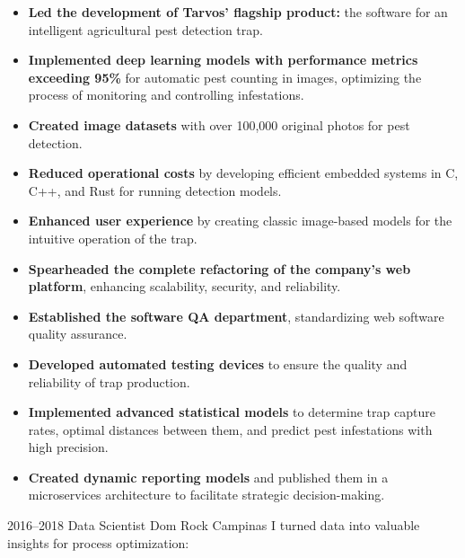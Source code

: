 \documentclass[11pt,a4paper,sans]{moderncv}        %
\begin{document}
\begin{itemize}%
  \item \textbf{Led the development of Tarvos' flagship product:} the software for an intelligent agricultural pest detection trap.
  \item \textbf{Implemented deep learning models with performance metrics exceeding 95\%} for automatic pest counting in images, optimizing the process of monitoring and controlling infestations.
  \item \textbf{Created image datasets} with over 100,000 original photos for pest detection.
  \item \textbf{Reduced operational costs} by developing efficient embedded systems in C, C++, and Rust for running detection models.
  \item \textbf{Enhanced user experience} by creating classic image-based models for the intuitive operation of the trap.
  \item \textbf{Spearheaded the complete refactoring of the company's web platform}, enhancing scalability, security, and reliability.
  \item \textbf{Established the software QA department}, standardizing web software quality assurance.
  \item \textbf{Developed automated testing devices} to ensure the quality and reliability of trap production.
  \item \textbf{Implemented advanced statistical models} to determine trap capture rates, optimal distances between them, and predict pest infestations with high precision.
  \item \textbf{Created dynamic reporting models} and published them in a microservices architecture to facilitate strategic decision-making.

\end{itemize}

\vspace{1em}
\cventry
{2016--2018}
{Data Scientist}
{Dom Rock}
{Campinas}{}
{I turned data into valuable insights for process optimization:}
\end{document}
